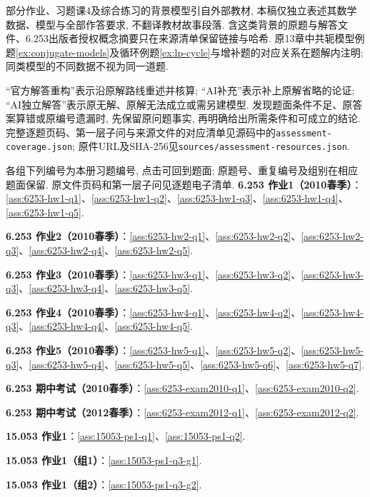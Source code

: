 部分作业、习题课4及综合练习的背景模型引自外部教材, 本稿仅独立表述其数学数据、模型与全部作答要求, 不翻译教材故事段落. 含这类背景的原题与解答文件、6.253出版者授权概念摘要只在来源清单保留链接与哈希. 原13章中共轭模型例题\ref{ex:conjugate-models}及循环例题\ref{ex:lp-cycle}与增补题的对应关系在题解内注明; 同类模型的不同数据不视为同一道题.

“官方解答重构”表示沿原解路线重述并核算; “AI补充”表示补上原解省略的论证; “AI独立解答”表示原无解、原解无法成立或需另建模型. 发现题面条件不足、原答案算错或原编号遗漏时, 先保留原问题事实, 再明确给出所需条件和可成立的结论. 完整逐题页码、第一层子问与来源文件的对应清单见源码中的\texttt{assessment-coverage.json}; 原件URL及SHA-256见\texttt{sources/assessment-resources.json}.

各组下列编号为本册习题编号, 点击可回到题面; 原题号、重复编号及组别在相应题面保留. 原文件页码和第一层子问见逐题电子清单.
\noindent\textbf{6.253 作业1（2010春季）}：\ref{ass:6253-hw1-q1}、\ref{ass:6253-hw1-q2}、\ref{ass:6253-hw1-q3}、\ref{ass:6253-hw1-q4}、\ref{ass:6253-hw1-q5}.\par
\noindent\textbf{6.253 作业2（2010春季）}：\ref{ass:6253-hw2-q1}、\ref{ass:6253-hw2-q2}、\ref{ass:6253-hw2-q3}、\ref{ass:6253-hw2-q4}、\ref{ass:6253-hw2-q5}.\par
\noindent\textbf{6.253 作业3（2010春季）}：\ref{ass:6253-hw3-q1}、\ref{ass:6253-hw3-q2}、\ref{ass:6253-hw3-q3}、\ref{ass:6253-hw3-q4}、\ref{ass:6253-hw3-q5}.\par
\noindent\textbf{6.253 作业4（2010春季）}：\ref{ass:6253-hw4-q1}、\ref{ass:6253-hw4-q2}、\ref{ass:6253-hw4-q3}、\ref{ass:6253-hw4-q4}、\ref{ass:6253-hw4-q5}.\par
\noindent\textbf{6.253 作业5（2010春季）}：\ref{ass:6253-hw5-q1}、\ref{ass:6253-hw5-q2}、\ref{ass:6253-hw5-q3}、\ref{ass:6253-hw5-q4}、\ref{ass:6253-hw5-q5}、\ref{ass:6253-hw5-q6}、\ref{ass:6253-hw5-q7}.\par
\noindent\textbf{6.253 期中考试（2010春季）}：\ref{ass:6253-exam2010-q1}、\ref{ass:6253-exam2010-q2}.\par
\noindent\textbf{6.253 期中考试（2012春季）}：\ref{ass:6253-exam2012-q1}、\ref{ass:6253-exam2012-q2}.\par
\noindent\textbf{15.053 作业1}：\ref{ass:15053-ps1-q1}、\ref{ass:15053-ps1-q2}.\par
\noindent\textbf{15.053 作业1（组1）}：\ref{ass:15053-ps1-q3-g1}.\par
\noindent\textbf{15.053 作业1（组2）}：\ref{ass:15053-ps1-q3-g2}.\par
